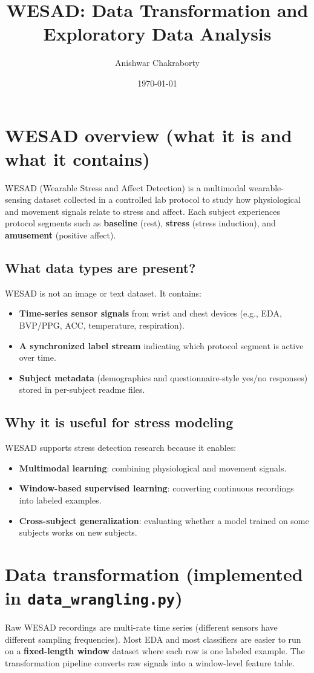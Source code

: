 \documentclass[11pt]{article}
\title{WESAD: Data Transformation and Exploratory Data Analysis}
\author{Anishwar Chakraborty}
\date{\today}
\begin{document}
\maketitle

\section{WESAD overview (what it is and what it contains)}
WESAD (Wearable Stress and Affect Detection) is a multimodal wearable-sensing dataset collected in a controlled lab protocol to study how
physiological and movement signals relate to stress and affect.
Each subject experiences protocol segments such as \textbf{baseline} (rest), \textbf{stress} (stress induction), and \textbf{amusement} (positive affect).

\subsection{What data types are present?}
WESAD is not an image or text dataset. It contains:
\begin{itemize}
  \item \textbf{Time-series sensor signals} from wrist and chest devices (e.g., EDA, BVP/PPG, ACC, temperature, respiration).
  \item \textbf{A synchronized label stream} indicating which protocol segment is active over time.
  \item \textbf{Subject metadata} (demographics and questionnaire-style yes/no responses) stored in per-subject readme files.
\end{itemize}

\subsection{Why it is useful for stress modeling}
WESAD supports stress detection research because it enables:
\begin{itemize}
  \item \textbf{Multimodal learning}: combining physiological and movement signals.
  \item \textbf{Window-based supervised learning}: converting continuous recordings into labeled examples.
  \item \textbf{Cross-subject generalization}: evaluating whether a model trained on some subjects works on new subjects.
\end{itemize}

\section{Data transformation (implemented in \texttt{data\_wrangling.py})}
Raw WESAD recordings are multi-rate time series (different sensors have different sampling frequencies).
Most EDA and most classifiers are easier to run on a \textbf{fixed-length window} dataset where each row is one labeled example.
The transformation pipeline converts raw signals into a window-level feature table.
\end{document}
